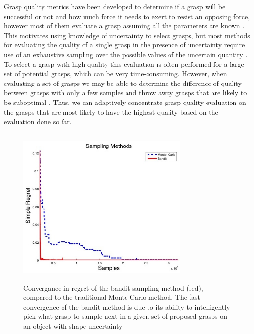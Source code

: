 \documentclass[letterpaper, 10 pt, conference]{ieeeconf}  %
\begin{document}
Grasp quality metrics have been developed to determine if a grasp will be successful or not and how much force it needs to exert to resist an opposing force, however most of them evaluate a grasp assuming all the parameters are known \cite{ferrari1992}.
This motivates using knowledge of uncertainty to select grasps, but most methods for evaluating the quality of a single grasp in the presence of uncertainty require use of an exhaustive sampling over the possible values of the uncertain quantity \cite{kim2012physically, weisz2012pose}.
To select a grasp with high quality this evaluation is often performed for a large set of potential grasps, which can be very time-consuming.
However, when evaluating a set of grasps we may be able to determine the difference of quality between grasps with only a few samples and throw away grasps that are likely to be suboptimal \cite{kehoe2012estimating}.
Thus, we can adaptively concentrate grasp quality evaluation on the grasps that are most likely to have the highest quality based on the evaluation done so far.

\begin{figure}[t!]
\centering
\includegraphics[width=8.5cm,height=8cm]{figures/Slide02.jpg}
\caption{\footnotesize
Convergance in regret of the bandit sampling method (red), compared to the traditional Monte-Carlo method. The fast convergence of the bandit method is due to its ability to intelligently pick what grasp to sample next in a given set of proposed grasps on an object with shape uncertainty}
\vspace*{-10pt}
\label{fig:noisy data}
\end{figure}
\end{document}
